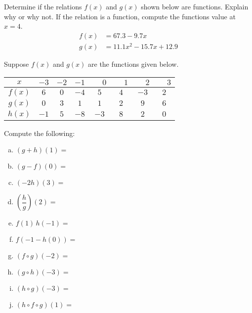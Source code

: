 \documentclass[11pt,letterpaper]{article}
\begin{document}
\newpage



 Determine if the relations $f(x)$ and $g(x)$ shown below are functions. Explain why or why not. If the relation is a function, compute the functions value at $x= 4$. 
	\[
	\begin{aligned}
	f(x)&= 67.3 - 9.7x \\[0.3cm]
	g(x)&= 11.1x^2 - 15.7x + 12.9
	\end{aligned}
	\]



\newpage



 Suppose $f(x)$ and $g(x)$ are the functions given below. 
        \begin{table}[!ht]
        \centering
        \begin{tabular}{| c || c | c | c | c | c | c | c |} \hline
	$x$ & $-3$ & $-2$ & $-1$ & $\phantom{-}0$ & $\phantom{-}1$ & $\phantom{-}2$ & $\phantom{-}3$ \\ \hline
	$f(x)$ & $6$ & $0$ & $-4$ & $5$ & $4$ & $-3$ & $2$ \\ \hline
	$g(x)$ & $0$ & $3$ & $1$ & $1$ & $2$ & $9$ & $6$ \\ \hline
	$h(x)$ & $-1$ & $5$ & $-8$ & $-3$ & $8$ & $2$ & $0$ \\ \hline
        \end{tabular}
        \end{table}

Compute the following: \pspace
        \begin{enumerate}[(a)]
        \item $(g + h)(1)=$ \vfill
        \item $(g - f)(0)=$ \vfill
        \item $(-2h)(3)=$ \vfill
        \item $\left(\dfrac{h}{g}\right)(2)=$ \vfill
        \item $f(1)\, h(-1)=$ \vfill
        \item $f(-1 - h(0))=$ \vfill
        \item $(f \circ g)(-2)=$ \vfill
	\item $(g \circ h)(-3)=$ \vfill
        \item $(h \circ g)(-3)=$ \vfill
	\item $(h \circ f \circ g)(1)=$ \vfill
        \end{enumerate} \pspace
\end{document}
